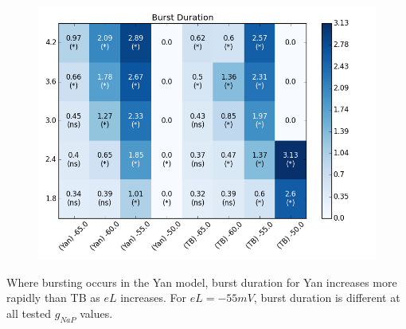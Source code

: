 \documentclass[11pt]{article}
\begin{document}
   
\begin{figure}
\centering
\includegraphics[scale=.4]{heatmap_Burst_Duration.png}
\end{figure}
Where bursting occurs in the Yan model, burst duration for Yan increases more rapidly than TB as $eL$ increases. For $eL=-55 mV$, burst duration is different at all tested $g_{NaP}$ values.
\end{document}
